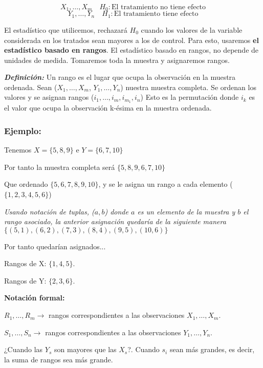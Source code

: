 \[
    X_1,\dots,X_m \quad H_0: \text{El tratamiento no tiene efecto} 
\]
\[
    Y_1,\dots,Y_n \quad H_1: \text{El tratamiento tiene efecto} 
\]

El estadístico que utilicemos, rechazará $H_0$ cuando los valores de la variable considerada en los tratados sean mayores a los de control.
Para esto, usaremos \textbf{el estadístico basado en rangos}.
El estadístico basado en rangos, no depende de unidades de medida. Tomaremos toda la muestra y asignaremos rangos.

\textbf{\textit{Definición:}} Un rango es el lugar que ocupa la observación en la muestra ordenada.
Sean ($X_1,\dots,X_m$, $Y_1,\dots,Y_n$) nuestra muestra completa. Se ordenan los valores y se asignan rangos ($i_1,\dots,i_m,i_{m_1},i_n$)
Esto es la permutación donde $i_k$ es el valor que ocupa la observación k-ésima en la muestra ordenada.

\subsubsection*{Ejemplo:}

Tenemos $X=\{5,8,9\}$ e $Y=\{6,7,10\}$

Por tanto la muestra completa será $\{5,8,9,6,7,10\}$

Que ordenado $\{5,6,7,8,9,10\}$, y se le asigna un rango a cada elemento ($\{1,2,3,4,5,6\}$)

\vspace{2mm}

\noindent \textit{Usando notación de tuplas, ($a, b$) donde $a$ es un elemento de la muestra y $b$ el rango asociado, la anterior asignación quedaría de la siguiente manera $\{(5, 1),(6, 2),(7, 3),(8, 4),(9, 5),(10, 6)\}$}

\vspace{2mm}

\noindent Por tanto quedarían asignados...

Rangos de X: $\{1,4,5\}$.

Rangos de Y: $\{2,3,6\}$.

\vspace{5mm}

\noindent \textbf{Notación formal:}

$R_1,\dots,R_m \longrightarrow$ rangos correspondientes a las observaciones $X_1,\dots,X_m$.

$S_1,\dots,S_n \longrightarrow$ rangos correspondientes a las observaciones $Y_1,\dots,Y_n$.

¿Cuando las $Y_s$ son mayores que las $X_s$?. Cuando $s_i$ sean más grandes, es decir, la suma de rangos sea más grande.

